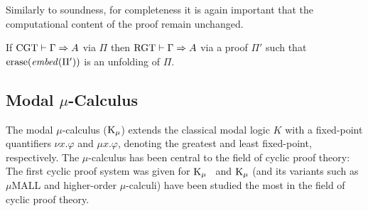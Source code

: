 Similarly to soundness, for completeness it is again important that the
computational content of the proof remain unchanged.

\begin{theorem}[Completeness]
  If $\mathrm{CGT} \vdash \Gamma \Rightarrow A$ via $\Pi$ then $\mathrm{RGT} \vdash
  \Gamma \Rightarrow A$ via a proof $\Pi'$ such that
  $\mathrm{erase}(\mathit{embed}(\Pi'))$ is an unfolding of $\Pi$.
\end{theorem}


\subsection{Modal $\mu$-Calculus}
\label{sec:modal-mu}

The modal $\mu$-calculus ($\mathrm{K}_\mu$) extends the classical modal logic $K$ with a
fixed-point quantifiers $\nu x. \varphi$ and $\mu x. \varphi$, denoting the
greatest and least fixed-point, respectively. The $\mu$-calculus has been
central to the field of cyclic proof theory: 
The first cyclic proof system was given for
$\mathrm{K}_\mu$~\parencite{niwinskiGamesMcalculus1996} and $\mathrm{K}_\mu$ (and its variants such as
$\mu$MALL and higher-order $\mu$-calculi) have been studied the most in the
field of cyclic proof theory.


